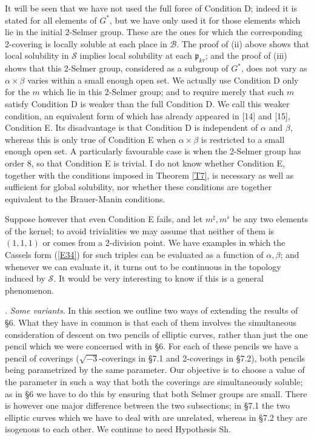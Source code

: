 \documentclass[12pt]{article}
\def\fp{{\mathfrak p}}
\def\ga{{\alpha}}
\def\gb{{\beta}}
\def\sB{{\mathcal B}}
\def\sS{{\mathcal S}}
\def\Sha{\mbox{\wncyr Sh}}
\begin{document}
\medskip

It will be seen that we have not used the full force of
Condition D; indeed it is stated for all elements of $G^*$,
but we have only used it for those elements which lie in the
initial 2-Selmer group. These are the ones for which the
corresponding 2-covering is locally soluble at each place in
$\sB$. The proof of (ii) above shows that local solubility in
$\sS$ implies local solubility at each $\fp_{k\tau}$; and the
proof of (iii) shows that this 2-Selmer group, considered as
a subgroup of $G^*$, does not vary as $\ga\times\gb$ varies
within a small enough open set. We actually use Condition D
only for the $m$ which lie in this 2-Selmer group; and to
require merely that such $m$ satisfy Condition D is weaker
than the full Condition D. We call this weaker condition, an
equivalent form of which has already appeared in [14] and
[15], Condition E. Its disadvantage is that Condition D is
independent of $\ga$ and $\gb$, whereas this is only true of
Condition E when $\ga\times\gb$ is restricted to a
small enough open set. A particularly favourable case is when
the 2-Selmer group has order 8, so that Condition E is
trivial. I do not know whether Condition E, together with the
conditions imposed in Theorem \ref{T7}, is necessary as well
as sufficient for global solubility,
nor whether these conditions are
together equivalent to the Brauer-Manin conditions.

\medskip

Suppose however that even Condition E fails, and let $m^\sharp,m^\flat$ be
any two
elements of the kernel; to avoid trivialities we may assume that neither of
them is $(1,1,1)$ or comes from a 2-division point. We have examples in which
the Cassels form (\ref{E34}) for such triples can be evaluated as a function of
$\ga,\gb$; and whenever we can evaluate it, it turns out to be continuous in
the topology induced by $\sS$. It would be very interesting to know if this is
a general phenomenon.


\newpage

. \emph{Some variants}. \newline
In this section we outline two ways of extending the results
of \S6. What they have in common is that each of them involves
the simultaneous consideration of descent on two pencils of
elliptic curves, rather than just the one pencil which we were
concerned with in \S6. For each of these pencils we have a
pencil of coverings ($\sqrt{-3}$-coverings in \S7.1 and
2-coverings in \S7.2), both pencils being parametrized by the
same parameter. Our objective is to choose a value of the
parameter in such a way that both the coverings are
simultaneously soluble; as in \S6 we have to do this by
ensuring that both Selmer groups are small. There is however
one major difference between the two subsections; in \S7.1 the
two elliptic curves which we have to deal with are unrelated,
whereas in \S7.2 they are isogenous to each other. We
continue to need Hypothesis \Sha.
\end{document}
